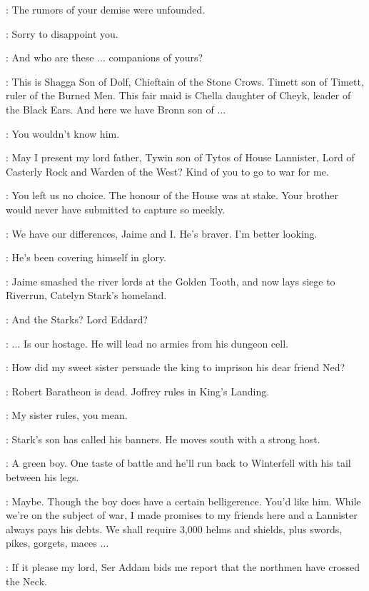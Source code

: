 \TYWIN: The rumors of your demise were unfounded. 

\TYRION: Sorry to disappoint you. 

\TYWIN: And who are these $\ldots$ companions of yours? 

\TYRION: This is Shagga Son of Dolf, Chieftain of the Stone Crows. Timett son of Timett, ruler of the Burned Men. This fair maid is Chella daughter of Cheyk, leader of the Black Ears. And here we have Bronn son of $\ldots$ 

\BRONN: You wouldn't know him. 

\TYRION: May I present my lord father, Tywin son of Tytos of House Lannister, Lord of Casterly Rock and Warden of the West? Kind of you to go to war for me. 

\TYWIN: You left us no choice. The honour of the House was at stake. Your brother would never have submitted to capture so meekly. 

\TYRION: We have our differences, Jaime and I. He's braver. I'm better looking. 

\TYWIN: He's been covering himself in glory. 

\KEVAN: Jaime smashed the river lords at the Golden Tooth, and now lays siege to Riverrun, Catelyn Stark's homeland. 

\TYRION: And the Starks? Lord Eddard? 

\TYWIN: $\ldots$ Is our hostage. He will lead no armies from his dungeon cell. 

\TYRION: How did my sweet sister persuade the king to imprison his dear friend Ned? 

\TYWIN: Robert Baratheon is dead. Joffrey rules in King's Landing. 

\TYRION: My sister rules, you mean. 

\KEVAN: Stark's son has called his banners. He moves south with a strong host. 

\TYWIN: A green boy. One taste of battle and he'll run back to Winterfell with his tail between his legs. 

\TYRION: Maybe. Though the boy does have a certain belligerence. You'd like him. While we're on the subject of war, I made promises to my friends here and a Lannister always pays his debts. We shall require 3,000 helms and shields, plus swords, pikes, gorgets, maces $\ldots$  


\PAGE: If it please my lord, Ser Addam bids me report that the northmen have crossed the Neck. 

